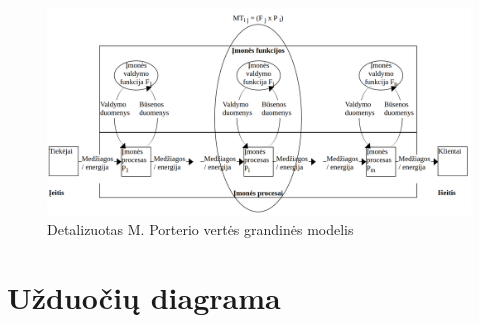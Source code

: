 \documentclass{VUMIFInfBakalaurinis}
\begin{document}
\begin{figure}[H]
	\centering
	\includegraphics[width=\textwidth]{img/detalized_porter_vcm}
	\caption{Detalizuotas M. Porterio vertės grandinės modelis}
	\label{img:detalized_porter_vcm}
\end{figure} 


\section{Užduočių diagrama}
\end{document}
